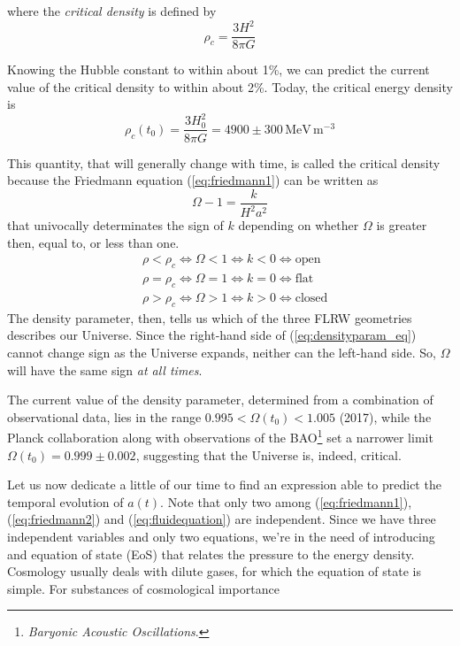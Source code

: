 where the \emph{critical density} is defined by
\begin{equation}
    \rho_{c} = \frac{3H^{2}}{8\pi G}
\end{equation}
\par Knowing the Hubble constant to within about 1\%, we can predict the current value of the critical density to within about 2\%. Today, the critical energy density is
\begin{equation}
    \rho_{c}(t_{0}) = \frac{3H_{0}^{2}}{8\pi G} = 4900 \pm 300\,\text{MeV}\,\text{m}^{-3}
\end{equation}
\par This quantity, that will generally change with time, is called the critical density because the Friedmann equation (\ref{eq:friedmann1}) can be written as
\begin{equation}
    \Omega - 1 = \frac{k}{H^{2}a^{2}}
    \label{eq:densityparam_eq}
\end{equation}
that univocally determinates the sign of $k$ depending on whether $\Omega$ is greater then, equal to, or less than one.
\begin{align*}
    & \rho < \rho_{c} \iff \Omega < 1 \iff k < 0 \iff \text{open} \\
    & \rho = \rho_{c} \iff \Omega = 1 \iff k = 0 \iff \text{flat} \\
    & \rho > \rho_{c} \iff \Omega > 1 \iff k > 0 \iff \text{closed} 
\end{align*}
The density parameter, then, tells us which of the three FLRW geometries describes our Universe. Since the right-hand side of (\ref{eq:densityparam_eq}) cannot change sign as the Universe expands, neither can the left-hand side. So, $\Omega$ will have the same sign \emph{at all times}.
\par The current value of the density parameter, determined from a combination of observational data, lies in the range $0.995<\Omega(t_{0})<1.005$ (2017), while the Planck collaboration along with observations of the BAO\footnote{\emph{Baryonic Acoustic Oscillations}.} set a narrower limit $\Omega(t_{0}) = 0.999 \pm 0.002$, suggesting that the Universe is, indeed, critical.
\par Let us now dedicate a little of our time to find an expression able to predict the temporal evolution of $a(t)$. Note that only two among (\ref{eq:friedmann1}), (\ref{eq:friedmann2}) and (\ref{eq:fluidequation}) are independent. Since we have three independent variables and only two equations, we're in the need of introducing and equation of state (EoS) that relates the pressure to the energy density. Cosmology usually deals with dilute gases, for which the equation of state is simple. For substances of cosmological importance
